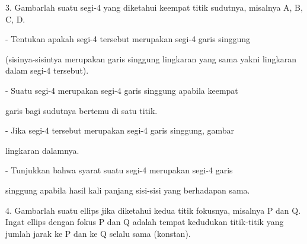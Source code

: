 \documentclass[12pt,arial,letterpaper]{book}
\begin{document}
\begin{eulercomment}
\begin{eulercomment}
\begin{eulercomment}
\begin{eulercomment}
\begin{eulercomment}
\begin{eulercomment}
\begin{eulercomment}
\begin{eulercomment}
\begin{eulercomment}
\begin{eulercomment}
\begin{eulercomment}
\begin{eulercomment}
\begin{eulercomment}
\begin{eulercomment}
\begin{eulercomment}
\begin{eulercomment}
\begin{eulercomment}
\begin{eulercomment}
\begin{eulercomment}
\begin{eulercomment}
\begin{eulercomment}
\begin{eulercomment}
\begin{eulercomment}
\begin{eulercomment}
\begin{eulercomment}
\begin{eulercomment}
\begin{eulercomment}
\begin{eulercomment}
\begin{eulercomment}
\begin{eulercomment}
\begin{eulercomment}
3. Gambarlah suatu segi-4 yang diketahui keempat titik sudutnya,
misalnya A, B, C, D.\\
\end{eulercomment}
\begin{eulerttcomment}
   - Tentukan apakah segi-4 tersebut merupakan segi-4 garis singgung
\end{eulerttcomment}
\begin{eulercomment}
(sisinya-sisintya merupakan garis singgung lingkaran yang sama yakni
lingkaran dalam segi-4 tersebut).\\
\end{eulercomment}
\begin{eulerttcomment}
   - Suatu segi-4 merupakan segi-4 garis singgung apabila keempat
\end{eulerttcomment}
\begin{eulercomment}
garis bagi sudutnya bertemu di satu titik.\\
\end{eulercomment}
\begin{eulerttcomment}
   - Jika segi-4 tersebut merupakan segi-4 garis singgung, gambar
\end{eulerttcomment}
\begin{eulercomment}
lingkaran dalamnya.\\
\end{eulercomment}
\begin{eulerttcomment}
   - Tunjukkan bahwa syarat suatu segi-4 merupakan segi-4 garis
\end{eulerttcomment}
\begin{eulercomment}
singgung apabila hasil kali panjang sisi-sisi yang berhadapan sama.

4. Gambarlah suatu ellips jika diketahui kedua titik fokusnya,
misalnya P dan Q. Ingat ellips dengan fokus P dan Q adalah tempat
kedudukan titik-titik yang jumlah jarak ke P dan ke Q selalu sama
(konstan).


\end{eulercomment}
\end{eulercomment}
\end{eulercomment}
\end{eulercomment}
\end{eulercomment}
\end{eulercomment}
\end{eulercomment}
\end{eulercomment}
\end{eulercomment}
\end{eulercomment}
\end{eulercomment}
\end{eulercomment}
\end{eulercomment}
\end{eulercomment}
\end{eulercomment}
\end{eulercomment}
\end{eulercomment}
\end{eulercomment}
\end{eulercomment}
\end{eulercomment}
\end{eulercomment}
\end{eulercomment}
\end{eulercomment}
\end{eulercomment}
\end{eulercomment}
\end{eulercomment}
\end{eulercomment}
\end{eulercomment}
\end{eulercomment}
\end{eulercomment}
\end{eulercomment}
\end{document}
